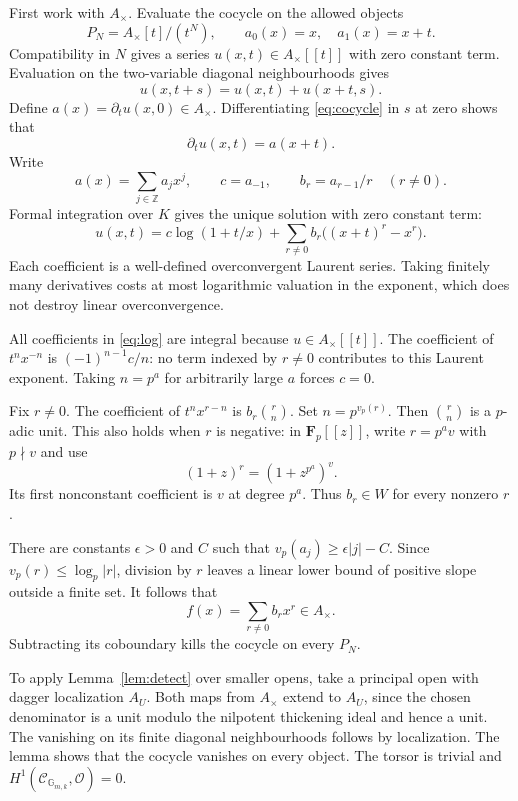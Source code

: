 \documentclass[11pt]{article}
\newcommand{\OO}{\mathcal O}\newcommand{\CC}{\mathcal C}
\theoremstyle{definition}\newtheorem{definition}[theorem]{Definition}
\theoremstyle{remark}\newtheorem{remark}[theorem]{Remark}
\begin{document}
First work with $A_\times$. Evaluate the cocycle on the allowed objects
\[
 P_N=A_\times[t]/(t^N),
 \qquad a_0(x)=x,\quad a_1(x)=x+t.
\]
Compatibility in $N$ gives a series $u(x,t)\in A_\times[[t]]$ with zero constant term. Evaluation on the two-variable diagonal neighbourhoods gives
\begin{equation}\label{eq:cocycle}
 u(x,t+s)=u(x,t)+u(x+t,s).
\end{equation}
Define $a(x)=\partial_tu(x,0)\in A_\times$. Differentiating \eqref{eq:cocycle} in $s$ at zero shows that
\[
 \partial_tu(x,t)=a(x+t).
\]
Write
\[
 a(x)=\sum_{j\in\mathbb Z}a_jx^j,\qquad
 c=a_{-1},\qquad b_r=a_{r-1}/r\quad(r\ne0).
\]
Formal integration over $K$ gives the unique solution with zero constant term:
\begin{equation}\label{eq:log}
 u(x,t)=c\log(1+t/x)
       +\sum_{r\ne0}b_r\big((x+t)^r-x^r\big).
\end{equation}
Each coefficient is a well-defined overconvergent Laurent series. Taking finitely many derivatives costs at most logarithmic valuation in the exponent, which does not destroy linear overconvergence.

All coefficients in \eqref{eq:log} are integral because $u\in A_\times[[t]]$. The coefficient of $t^nx^{-n}$ is $(-1)^{n-1}c/n$: no term indexed by $r\ne0$ contributes to this Laurent exponent. Taking $n=p^a$ for arbitrarily large $a$ forces $c=0$.

Fix $r\ne0$. The coefficient of $t^nx^{r-n}$ is $b_r\binom rn$. Set $n=p^{v_p(r)}$. Then $\binom rn$ is a $p$-adic unit. This also holds when $r$ is negative: in $\mathbf F_p[[z]]$, write $r=p^av$ with $p\nmid v$ and use
\[
 (1+z)^r=(1+z^{p^a})^v.
\]
Its first nonconstant coefficient is $v$ at degree $p^a$. Thus $b_r\in W$ for every nonzero $r$.

There are constants $\epsilon>0$ and $C$ such that $v_p(a_j)\geq\epsilon|j|-C$. Since $v_p(r)\leq\log_p|r|$, division by $r$ leaves a linear lower bound of positive slope outside a finite set. It follows that
\[
 f(x)=\sum_{r\ne0}b_rx^r\in A_\times.
\]
Subtracting its coboundary kills the cocycle on every $P_N$.

To apply Lemma~\ref{lem:detect} over smaller opens, take a principal open with dagger localization $A_U$. Both maps from $A_\times$ extend to $A_U$, since the chosen denominator is a unit modulo the nilpotent thickening ideal and hence a unit. The vanishing on its finite diagonal neighbourhoods follows by localization. The lemma shows that the cocycle vanishes on every object. The torsor is trivial and $H^1(\CC_{\mathbb G_{m,k}},\OO)=0$.
\end{document}
